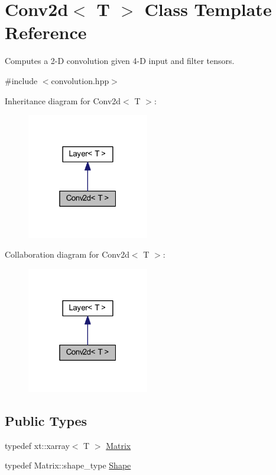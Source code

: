 \hypertarget{class_conv2d}{}\section{Conv2d$<$ T $>$ Class Template Reference}
\label{class_conv2d}


Computes a 2-\/D convolution given 4-\/D input and filter tensors.  




{\ttfamily \#include $<$convolution.\+hpp$>$}



Inheritance diagram for Conv2d$<$ T $>$\+:\nopagebreak
\begin{figure}[H]
\begin{center}
\leavevmode
\includegraphics[width=151pt]{class_conv2d__inherit__graph}
\end{center}
\end{figure}


Collaboration diagram for Conv2d$<$ T $>$\+:\nopagebreak
\begin{figure}[H]
\begin{center}
\leavevmode
\includegraphics[width=151pt]{class_conv2d__coll__graph}
\end{center}
\end{figure}
\subsection*{Public Types}
\begin{DoxyCompactItemize}
\item 
typedef xt\+::xarray$<$ T $>$ \mbox{\hyperlink{class_conv2d_a8263e2f2c46243e39fbca5712603c0fd}{Matrix}}
\item 
typedef Matrix\+::shape\+\_\+type \mbox{\hyperlink{class_conv2d_a78480f9c798b598a0bda9eadb1731225}{Shape}}
\end{DoxyCompactItemize}
